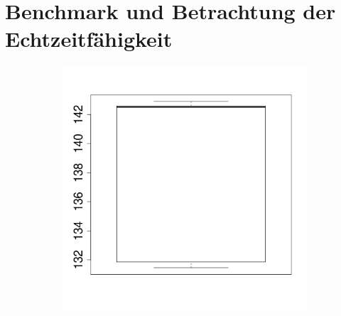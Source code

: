 \documentclass[
  a4paper,					    %
  twoside,
  DIV=calc,     				%
  bibliography=totoc,
  cleardoublepage=empty,
  ngerman,     					%
  final       					%
]{scrbook}
\begin{document}
% 
\section{Benchmark und Betrachtung der Echtzeitfähigkeit}
\label{sec:Benchmark}
%
%


\begin{figure}
    \centering
    \begin{subfigure}[b]{0.49\textwidth}
        \centering
        \includegraphics[width=\textwidth]{boxplot_as}
        \caption{}
        \label{fig:}
    \end{subfigure}
    \begin{subfigure}[b]{0.49\textwidth}
        \centering

\end{subfigure}
\end{figure}
\end{document}
